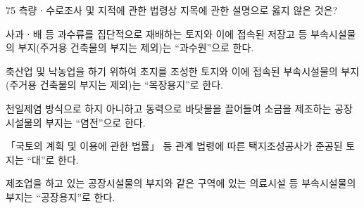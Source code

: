 \begin{question}{75}
측량ㆍ수로조사 및 지적에 관한 법령상 지목에 관한 설명으로 옳지 않은 것은?
\begin{choices}
  \item 사과ㆍ배 등 과수류를 집단적으로 재배하는 토지와 이에 접속된 저장고 등 부속시설물의 부지(주거용 건축물의 부지는 제외)는 “과수원”으로 한다.
  \item 축산업 및 낙농업을 하기 위하여 초지를 조성한 토지와 이에 접속된 부속시설물의 부지(주거용 건축물의 부지는 제외)는 “목장용지”로 한다.
  \item 천일제염 방식으로 하지 아니하고 동력으로 바닷물을 끌어들여 소금을 제조하는 공장시설물의 부지는 “염전”으로 한다.
  \item 「국토의 계획 및 이용에 관한 법률」 등 관계 법령에 따른 택지조성공사가 준공된 토지는 “대”로 한다.
  \item 제조업을 하고 있는 공장시설물의 부지와 같은 구역에 있는 의료시설 등 부속시설물의 부지는 “공장용지”로 한다.
\end{choices}
\end{question}
